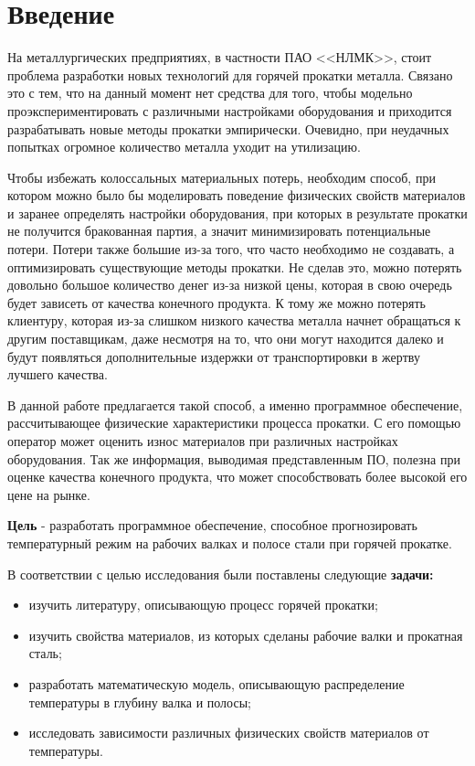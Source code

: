 \section*{Введение}

На металлургических предприятиях, в частности ПАО <<НЛМК>>, стоит проблема разработки новых технологий для горячей прокатки металла. Связано это с тем, что на данный момент нет средства для того, чтобы модельно проэкспериментировать с различными настройками оборудования и приходится разрабатывать новые методы прокатки эмпирически. Очевидно, при неудачных попытках огромное количество металла уходит на утилизацию. 

Чтобы избежать колоссальных материальных потерь, необходим способ, при котором можно было бы моделировать поведение физических свойств материалов и заранее определять настройки оборудования, при которых в результате прокатки не получится бракованная партия, а значит минимизировать потенциальные потери. Потери также большие из-за того, что часто необходимо не создавать, а оптимизировать существующие методы прокатки. Не сделав это, можно потерять довольно большое количество денег из-за низкой цены, которая в свою очередь будет зависеть от качества конечного продукта. К тому же можно потерять клиентуру, которая из-за слишком низкого качества металла начнет обращаться к другим поставщикам, даже несмотря на то, что они могут находится далеко и будут появляться дополнительные издержки от транспортировки в жертву лучшего качества.

В данной работе предлагается такой способ, а именно программное обеспечение, рассчитывающее физические характеристики процесса прокатки. С его помощью оператор может оценить износ материалов при различных настройках оборудования. Так же информация, выводимая представленным ПО, полезна при оценке качества конечного продукта, что может способствовать более высокой его цене на рынке.

\textbf{Цель} - разработать программное обеспечение, способное прогнозировать температурный режим на рабочих валках и полосе стали при горячей прокатке.

В соответствии с целью исследования были поставлены следующие \textbf{задачи:}
	\begin{itemize}
		\item изучить литературу, описывающую процесс горячей прокатки;
		\item изучить свойства материалов, из которых сделаны рабочие валки и прокатная сталь;
		\item разработать математическую модель, описывающую распределение температуры в глубину валка и полосы;
		\item исследовать зависимости различных физических свойств материалов от температуры.
   	\end{itemize}
\newpage
